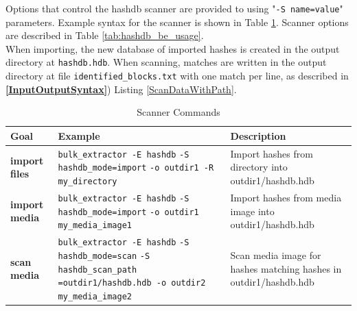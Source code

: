 \documentclass[11pt,fleqn]{article} %
\begin{document}
Options that control the hashdb scanner are provided to \bulk using "\verb+-S name=value+" parameters.  Example syntax for the \bulk \hdb scanner is shown in Table \ref{tab:hashdbScanner}.  Scanner options are described in Table \ref{tab:hashdb_be_usage}.\\

When importing, the new database of imported hashes is created in the output directory at \verb+hashdb.hdb+.  When scanning, matches are written in the output directory at file \verb+identified_blocks.txt+ with one match per line, as described in \textbf{\autoref{InputOutputSyntax}}) Listing \ref{ScanDataWithPath}.\\

\begin{table}[!ht]
\centering
\caption{\bulk \hdb Scanner Commands}
\label{tab:hashdbScanner}
\begin{tabular}{|p{3.5 cm}|p{6 cm}|p{4 cm}|}
\hline \hline
\textbf{Goal} & \textbf{Example} & \textbf{Description} \\
\hline
\textbf{import files} & \verb+bulk_extractor -E hashdb+ \verb+-S hashdb_mode=import+ \verb+-o outdir1 -R my_directory+ & Import hashes from directory into outdir1/hashdb.hdb\\
\hline
\textbf{import media} & \verb+bulk_extractor -E hashdb+ \verb+-S hashdb_mode=import+ \verb+-o outdir1 my_media_image1+ & Import hashes from media image into outdir1/hashdb.hdb\\
\hline
\textbf{scan media} & \verb+bulk_extractor -E hashdb+ \verb+-S hashdb_mode=scan+ \verb+-S hashdb_scan_path+ \verb+=outdir1/hashdb.hdb -o outdir2+ \verb+my_media_image2+ & Scan media image for hashes matching hashes in outdir1/hashdb.hdb\\
\hline
\end{tabular}
\end{table}
\end{document}
